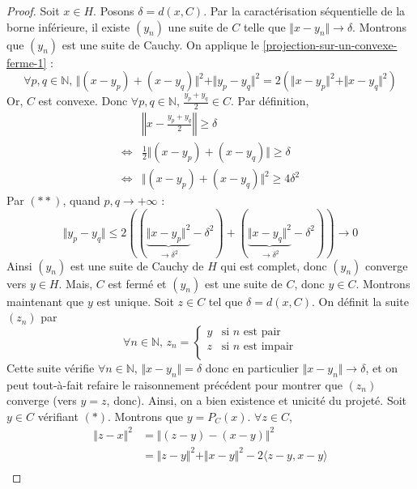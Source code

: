   \begin{proof}
    Soit $x \in H$. Posons $\delta = d(x, C)$. Par la caractérisation séquentielle de la borne inférieure, il existe $(y_n)$ une suite de $C$ telle que $\Vert x - y_n \Vert \longrightarrow \delta$. Montrons que $(y_n)$ est une suite de Cauchy. On applique le \cref{projection-sur-un-convexe-ferme-1} :
    \[ \forall p, q \in \mathbb{N}, \, \Vert (x - y_p) + (x - y_q) \Vert^2 + \Vert y_p - y_q \Vert^2 = 2(\Vert x - y_p \Vert^2 + \Vert x - y_q \Vert^2) \tag{$**$} \]
    Or, $C$ est convexe. Donc $\forall p, q \in \mathbb{N}$, $\frac{y_p + y_q}{2} \in C$.
    Par définition,
    \begin{align*}
      & \left\Vert x - \frac{y_p + y_q}{2} \right\Vert \geq \delta \\
      \iff& \frac{1}{2} \Vert (x - y_p) + (x - y_q) \Vert \geq \delta \\
      \iff& \Vert (x - y_p) + (x - y_q) \Vert^2 \geq 4 \delta^2
    \end{align*}
    Par $(**)$, quand $p, q \longrightarrow +\infty$ :
    \[ \Vert y_p - y_q \Vert \leq 2((\underbrace{\Vert x - y_p \Vert^2}_{\longrightarrow \delta^2} - \delta^2) + (\underbrace{\Vert x - y_q \Vert^2}_{\longrightarrow \delta^2} - \delta^2)) \longrightarrow 0 \]
    Ainsi $(y_n)$ est une suite de Cauchy de $H$ qui est complet, donc $(y_n)$ converge vers $y \in H$. Mais, $C$ est fermé et $(y_n)$ est une suite de $C$, donc $y \in C$.
    \newpar
    Montrons maintenant que $y$ est unique. Soit $z \in C$ tel que $\delta = d(x, C)$. On définit la suite $(z_n)$ par
    \[ \forall n \in \mathbb{N}, \, z_n =
    \begin{cases}
      y &\text{si } n \text{ est pair} \\
      z &\text{si } n \text{ est impair} \\
    \end{cases}
    \]
    Cette suite vérifie $\forall n \in \mathbb{N}$, $\Vert x - y_n \Vert = \delta$ donc en particulier $\Vert x - y_n \Vert \longrightarrow \delta$, et on peut tout-à-fait refaire le raisonnement précédent pour montrer que $(z_n)$ converge (vers $y = z$, donc). Ainsi, on a bien existence et unicité du projeté.
    \newpar
    Soit $y \in C$ vérifiant $(*)$. Montrons que $y = P_C(x)$. $\forall z \in C$,
    \begin{align*}
      \Vert z - x \Vert^2 &= \Vert (z - y) - (x - y) \Vert^2 \\
      &= \Vert z - y \Vert^2 + \Vert x - y \Vert^2 - 2 \langle z - y, x - y \rangle \\

\end{align*}
\end{proof}

